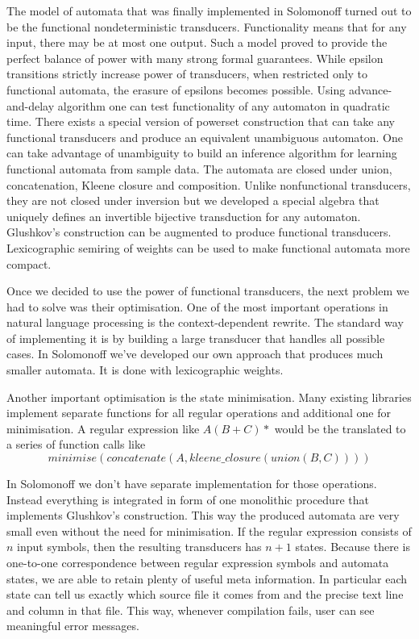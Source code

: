 The model of automata that was finally implemented in Solomonoff turned out to be the functional nondeterministic transducers. Functionality means that for any input, there may be at most one output. Such a  model proved to provide the perfect balance of power with many strong formal guarantees. While epsilon transitions strictly increase power of transducers, when restricted only to functional automata, the erasure of epsilons becomes possible. Using advance-and-delay algorithm one can test functionality of any automaton in quadratic time. There exists a special version of powerset construction that can take any functional transducers and produce an equivalent unambiguous automaton. One can take advantage of unambiguity to build an inference algorithm for learning functional automata from sample data.  The automata are closed under union, concatenation, Kleene closure and composition. Unlike nonfunctional transducers, they are not closed under inversion but we developed a special algebra that uniquely defines an invertible  bijective transduction for any automaton. Glushkov's construction can be augmented to produce functional transducers.  Lexicographic semiring of weights can be used to make functional automata more compact.  


Once we decided to use the power of functional transducers, the next problem we had to solve was their optimisation. One of the most important operations in natural language processing is the context-dependent rewrite. The standard way of implementing it is by building a large transducer that handles all possible cases.
In Solomonoff we've developed our own approach that produces much smaller automata. It is done with lexicographic weights.

Another important optimisation is the state minimisation. Many existing libraries implement separate functions for all regular operations and additional one for minimisation. A regular expression like $A(B+C)*$ would be the translated to a series of function calls like 
\[
minimise(concatenate(A,kleene\_closure(union(B,C))))
\]

In Solomonoff we don't have separate implementation for those operations. Instead everything is integrated in form of one monolithic procedure that implements Glushkov's construction. This way the produced automata are very small even without the need for minimisation. If the regular expression consists of $n$ input symbols, then the resulting transducers has $n+1$ states. Because there is one-to-one correspondence between regular expression symbols and automata states, we are able to retain plenty of useful meta information. In particular each state can tell us exactly which source file it comes from and the precise text line and column in that file.  
This way, whenever compilation fails, user can see meaningful error messages.


